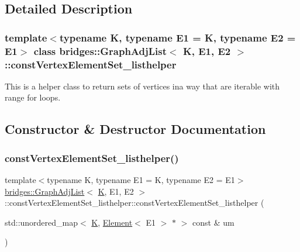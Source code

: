 \subsection{Detailed Description}
\subsubsection*{template$<$typename K, typename E1 = K, typename E2 = E1$>$\newline
class bridges\+::\+Graph\+Adj\+List$<$ K, E1, E2 $>$\+::const\+Vertex\+Element\+Set\+\_\+listhelper}

This is a helper class to return sets of vertices ina way that are iterable with range for loops. 

\subsection{Constructor \& Destructor Documentation}
\mbox{\label{classbridges_1_1_graph_adj_list_1_1const_vertex_element_set__listhelper_abfaf469c4ba34510664745aa57ab81b5}} 
\subsubsection{\texorpdfstring{constVertexElementSet\_listhelper()}{constVertexElementSet\_listhelper()}}
{\footnotesize\ttfamily template$<$typename K, typename E1 = K, typename E2 = E1$>$ \\
\mbox{\hyperlink{classbridges_1_1_graph_adj_list}{bridges\+::\+Graph\+Adj\+List}}$<$ \mbox{\hyperlink{namespacebridges_acfb0a4f7877d8f63de3e6862004c50edaa5f3c6a11b03839d46af9fb43c97c188}{K}}, E1, E2 $>$\+::const\+Vertex\+Element\+Set\+\_\+listhelper\+::const\+Vertex\+Element\+Set\+\_\+listhelper (\begin{DoxyParamCaption}\item[{std\+::unordered\+\_\+map$<$ \mbox{\hyperlink{namespacebridges_acfb0a4f7877d8f63de3e6862004c50edaa5f3c6a11b03839d46af9fb43c97c188}{K}}, \mbox{\hyperlink{classbridges_1_1_element}{Element}}$<$ E1 $>$ $\ast$ $>$ const \&}]{um }\end{DoxyParamCaption})\hspace{0.3cm}{\ttfamily [inline]}}



